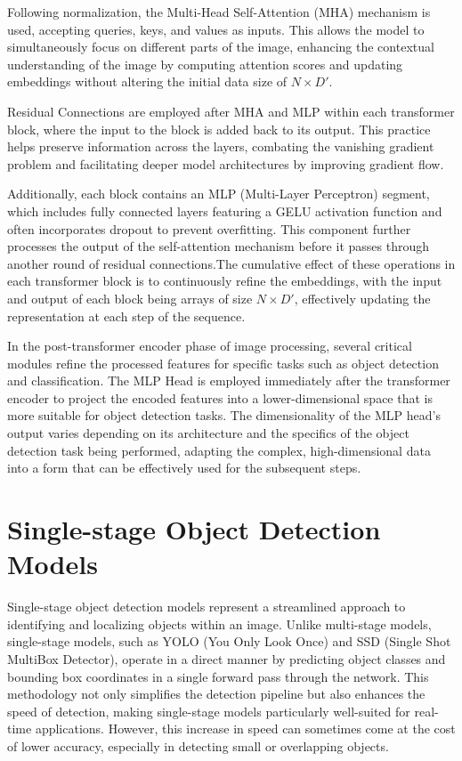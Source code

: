 Following normalization, the Multi-Head Self-Attention (MHA) mechanism is used, accepting queries, keys, and values as inputs. This allows 
the model to simultaneously focus on different parts of the image, enhancing the contextual understanding of the image by computing attention scores and 
updating embeddings without altering the initial data size of \(N \times D'\).

Residual Connections are employed after MHA and MLP within each transformer block, where the input to the block is added back to its output. 
This practice helps preserve information across the layers, combating the vanishing gradient problem and facilitating deeper model architectures by 
improving gradient flow.

Additionally, each block contains an MLP (Multi-Layer Perceptron) segment, which includes fully connected layers featuring a GELU activation function 
and often incorporates dropout to prevent overfitting. This component further processes the output of the self-attention mechanism before it passes 
through another round of residual connections.The cumulative effect of these operations in each transformer block is to continuously refine the embeddings, 
with the input and output of each block being arrays of size \(N \times D'\), effectively updating the representation at each step of the sequence.


In the post-transformer encoder phase of image processing, several critical modules refine the processed features for specific tasks such as object detection 
and classification. The MLP Head is employed immediately after the transformer encoder to project the encoded features into a lower-dimensional space that 
is more suitable for object detection tasks. The dimensionality of the MLP head's output varies depending on its architecture and the specifics of the object 
detection task being performed, adapting the complex, high-dimensional data into a form that can be effectively used for the subsequent steps.



\newpage
\section{Single-stage Object Detection Models}

Single-stage object detection models represent a streamlined approach to identifying and localizing objects within an image. Unlike multi-stage models, 
single-stage models, such as YOLO (You Only Look Once) and SSD (Single Shot MultiBox Detector), operate in a direct manner by predicting object classes and 
bounding box coordinates in a single forward pass through the network. This methodology not only simplifies the detection pipeline but also enhances the 
speed of detection, making single-stage models particularly well-suited for real-time applications. However, this increase in speed can sometimes come at 
the cost of lower accuracy, especially in detecting small or overlapping objects.

